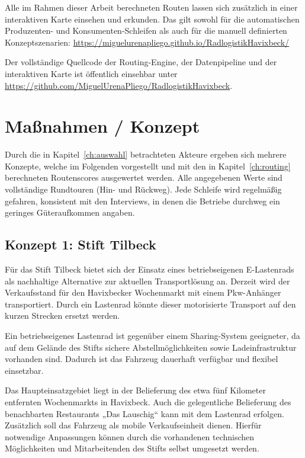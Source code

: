 \documentclass[a4paper,11pt,parskip=half,numbers=noenddot]{scrreprt}
\begin{document}
Alle im Rahmen dieser Arbeit berechneten Routen lassen sich zusätzlich in einer interaktiven Karte einsehen und erkunden. Das gilt sowohl für die automatischen Produzenten- und Konsumenten-Schleifen als auch für die manuell definierten Konzeptszenarien: \url{https://miguelurenapliego.github.io/RadlogistikHavixbeck/}

Der vollständige Quellcode der Routing-Engine, der Datenpipeline und der interaktiven Karte ist öffentlich einsehbar unter \url{https://github.com/MiguelUrenaPliego/RadlogistikHavixbeck}.

\chapter{Maßnahmen / Konzept}
\label{ch:massnahmen}

Durch die in Kapitel~\ref{ch:auswahl} betrachteten Akteure ergeben sich mehrere Konzepte, welche im Folgenden vorgestellt und mit den in Kapitel~\ref{ch:routing} berechneten Routenscores ausgewertet werden. Alle angegebenen Werte sind vollständige Rundtouren (Hin- und Rückweg). Jede Schleife wird regelmäßig gefahren, konsistent mit den Interviews, in denen die Betriebe durchweg ein geringes Güteraufkommen angaben.

\section{Konzept 1: Stift Tilbeck}

Für das Stift Tilbeck bietet sich der Einsatz eines betriebseigenen E-Lastenrads als nachhaltige Alternative zur aktuellen Transportlösung an. Derzeit wird der Verkaufsstand für den Havixbecker Wochenmarkt mit einem Pkw-Anhänger transportiert. Durch ein Lastenrad könnte dieser motorisierte Transport auf den kurzen Strecken ersetzt werden.

Ein betriebseigenes Lastenrad ist gegenüber einem Sharing-System geeigneter, da auf dem Gelände des Stifts sichere Abstellmöglichkeiten sowie Ladeinfrastruktur vorhanden sind. Dadurch ist das Fahrzeug dauerhaft verfügbar und flexibel einsetzbar.

Das Haupteinsatzgebiet liegt in der Belieferung des etwa fünf Kilometer entfernten Wochenmarkts in Havixbeck. Auch die gelegentliche Belieferung des benachbarten Restaurants „Das Lauschig“ kann mit dem Lastenrad erfolgen. Zusätzlich soll das Fahrzeug als mobile Verkaufseinheit dienen. Hierfür notwendige Anpassungen können durch die vorhandenen technischen Möglichkeiten und Mitarbeitenden des Stifts selbst umgesetzt werden.
\end{document}
